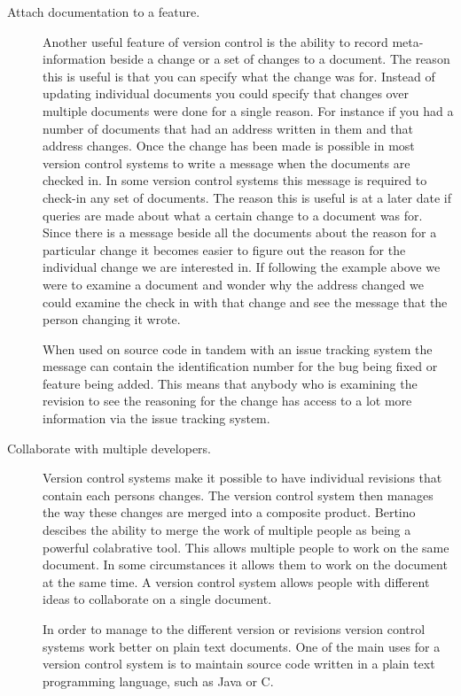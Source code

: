 \begin{description}
  \item [Attach documentation to a feature.]
  Another useful feature of version control is the ability to record meta-information beside a change or a set of changes to a document.  The reason this is useful is that you can specify what the change was for.  Instead of updating individual documents you could specify that changes over multiple documents were done for a single reason.  For instance if you had a number of documents that had an address written in them and that address changes.  Once the change has been made is possible in most version control systems to write a message when the documents are checked in.  In some version control systems this message is required to check-in any set of documents.  The reason this is useful is at a later date if queries are made about what a certain change to a document was for.  Since there is a message beside all the documents about the reason for a particular change it becomes easier to figure out the reason for the individual change we are interested in. If following the example above we were to examine a document and wonder why the address changed we could examine the check in with that change and see the message that the person changing it wrote.

  When used on source code in tandem with an issue tracking system the message can contain the identification number for the bug being fixed or feature being added.  This means that anybody who is examining the revision to see the reasoning for the change has access to a lot more information via the issue tracking system.


  \item [Collaborate with multiple developers.]
  Version control systems make it possible to have individual revisions that contain each persons changes. The version control system then manages the way these changes are merged into a composite product. Bertino \cite{Bertino2012} descibes the ability to merge the work of multiple people as being a powerful colabrative tool. This allows multiple people to work on the same document. In some circumstances it allows them to work on the document at the same time.   A version control system allows people with different ideas to collaborate on a single document.

  In order to manage to the different version or revisions version control systems work better on plain text documents. One of the main uses for a version control system is to maintain source code written in a plain text programming language, such as Java or C.

\end{description}



